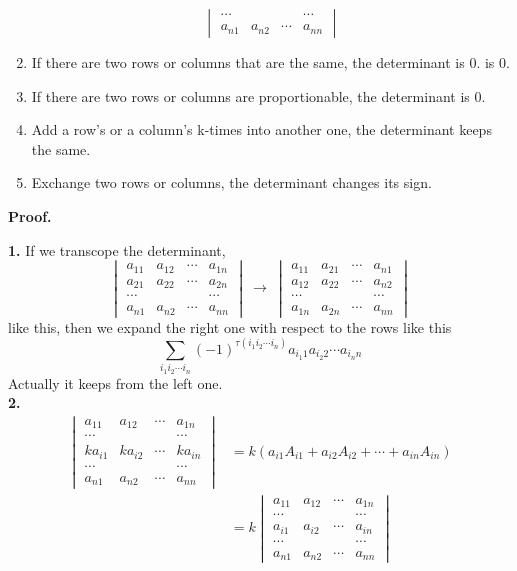 \documentclass{article}
\theoremstyle{definition}
\begin{document}
\begin{enumerate}
$$\begin{vmatrix}
        \cdots &  &  & \cdots\\
        a_{n1} & a_{n2} & \cdots & a_{nn}
    \end{vmatrix}$$
    \item If there are two rows or columns that are the same, the determinant is 0.
    is 0. 
    \item If there are two rows or columns are proportionable, the determinant is 0.
    \item Add a row's or a column's k-times into another one, the determinant keeps the same. 
    \item Exchange two rows or columns, the determinant changes its sign.
\end{enumerate}

\textbf{Proof.}

\textbf{1.}
If we transcope the determinant,
$$
\begin{vmatrix}
    a_{11} & a_{12} & \cdots & a_{1n}\\
    a_{21} & a_{22} & \cdots & a_{2n}\\
    \cdots &  &  & \cdots\\
    a_{n1} & a_{n2} & \cdots & a_{nn}
\end{vmatrix}
\ \rightarrow\ 
\begin{vmatrix}
    a_{11} & a_{21} & \cdots & a_{n1}\\
    a_{12} & a_{22} & \cdots & a_{n2}\\
    \cdots &  &  & \cdots\\
    a_{1n} & a_{2n} & \cdots & a_{nn}
\end{vmatrix}$$
like this, then we expand the right one with respect to the rows like this 
$$ \sum_{i_{1}i_{2}\cdots i_{n}}(-1)^{\tau (i_{1}i_{2}\cdots i_{n})} a_{i_{1}1}a_{i_{2}2}\cdots a_{i_{n}n}$$
Actually it keeps from the left one.\\
\textbf{2.}
\begin{align*}
\begin{vmatrix}
    a_{11} & a_{12} & \cdots & a_{1n}\\
    \cdots &  &  & \cdots\\
    ka_{i1} & ka_{i2} & \cdots & ka_{in}\\
    \cdots &  &  & \cdots\\
    a_{n1} & a_{n2} & \cdots & a_{nn}
\end{vmatrix}
& = k \left( a_{i1}A_{i1} + a_{i2}A_{i2} + \cdots + a_{in}A_{in} \right) \\
& = k \begin{vmatrix}
    a_{11} & a_{12} & \cdots & a_{1n}\\
    \cdots &  &  & \cdots\\
    a_{i1} & a_{i2} & \cdots & a_{in}\\
    \cdots &  &  & \cdots\\
    a_{n1} & a_{n2} & \cdots & a_{nn}
\end{vmatrix}
\end{align*}
\end{document}
